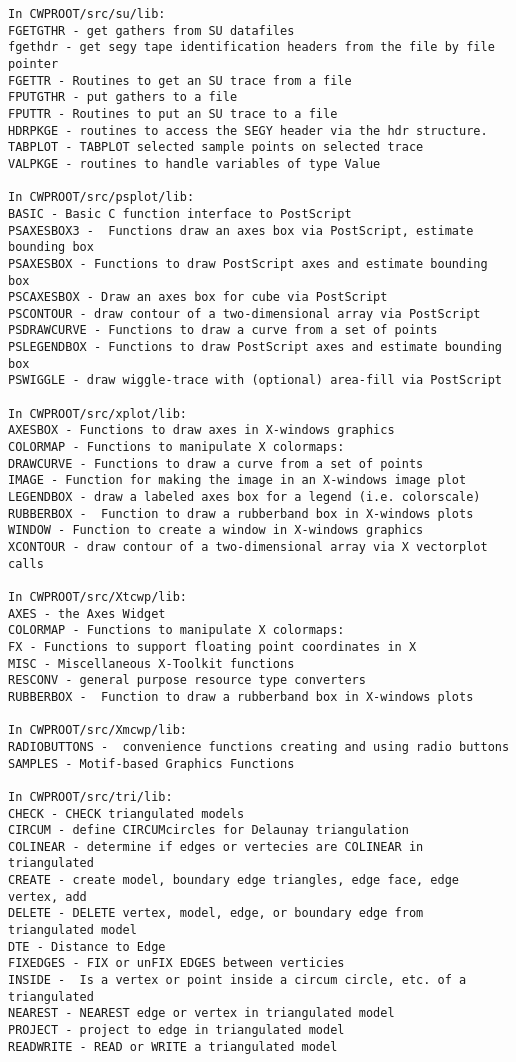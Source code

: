 {\begin{verbatim}
In CWPROOT/src/su/lib:
FGETGTHR - get gathers from SU datafiles
fgethdr - get segy tape identification headers from the file by file pointer
FGETTR - Routines to get an SU trace from a file 
FPUTGTHR - put gathers to a file
FPUTTR - Routines to put an SU trace to a file 
HDRPKGE - routines to access the SEGY header via the hdr structure.
TABPLOT - TABPLOT selected sample points on selected trace
VALPKGE - routines to handle variables of type Value

In CWPROOT/src/psplot/lib:
BASIC - Basic C function interface to PostScript
PSAXESBOX3 -  Functions draw an axes box via PostScript, estimate bounding box
PSAXESBOX - Functions to draw PostScript axes and estimate bounding box
PSCAXESBOX - Draw an axes box for cube via PostScript
PSCONTOUR - draw contour of a two-dimensional array via PostScript
PSDRAWCURVE - Functions to draw a curve from a set of points
PSLEGENDBOX - Functions to draw PostScript axes and estimate bounding box
PSWIGGLE - draw wiggle-trace with (optional) area-fill via PostScript

In CWPROOT/src/xplot/lib:
AXESBOX - Functions to draw axes in X-windows graphics
COLORMAP - Functions to manipulate X colormaps:
DRAWCURVE - Functions to draw a curve from a set of points
IMAGE - Function for making the image in an X-windows image plot
LEGENDBOX - draw a labeled axes box for a legend (i.e. colorscale)
RUBBERBOX -  Function to draw a rubberband box in X-windows plots
WINDOW - Function to create a window in X-windows graphics
XCONTOUR - draw contour of a two-dimensional array via X vectorplot calls

In CWPROOT/src/Xtcwp/lib:
AXES - the Axes Widget
COLORMAP - Functions to manipulate X colormaps:
FX - Functions to support floating point coordinates in X
MISC - Miscellaneous X-Toolkit functions
RESCONV - general purpose resource type converters
RUBBERBOX -  Function to draw a rubberband box in X-windows plots

In CWPROOT/src/Xmcwp/lib:
RADIOBUTTONS -  convenience functions creating and using radio buttons
SAMPLES - Motif-based Graphics Functions

In CWPROOT/src/tri/lib:
CHECK - CHECK triangulated models
CIRCUM - define CIRCUMcircles for Delaunay triangulation
COLINEAR - determine if edges or vertecies are COLINEAR in triangulated
CREATE - create model, boundary edge triangles, edge face, edge vertex, add
DELETE - DELETE vertex, model, edge, or boundary edge from triangulated model
DTE - Distance to Edge
FIXEDGES - FIX or unFIX EDGES between verticies
INSIDE -  Is a vertex or point inside a circum circle, etc. of a triangulated
NEAREST - NEAREST edge or vertex in triangulated model
PROJECT - project to edge in triangulated model
READWRITE - READ or WRITE a triangulated model


\end{verbatim}}
